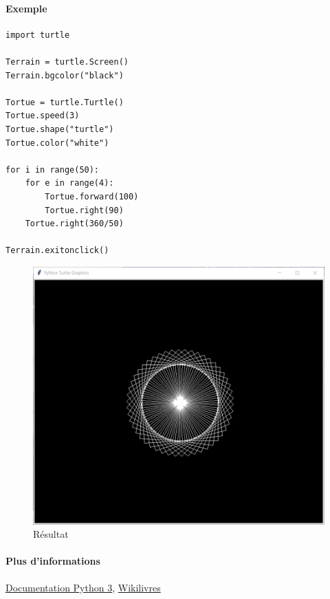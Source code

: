 \documentclass[a4paper, 10pt]{article}
\begin{document}
\paragraph{Exemple}
\begin{verbatim}
import turtle

Terrain = turtle.Screen()
Terrain.bgcolor("black")

Tortue = turtle.Turtle()
Tortue.speed(3)
Tortue.shape("turtle")
Tortue.color("white")

for i in range(50):
    for e in range(4):
        Tortue.forward(100)
        Tortue.right(90)
    Tortue.right(360/50)

Terrain.exitonclick()
\end{verbatim}

\begin{figure}[h]
    \begin{center}
        \includegraphics[scale=0.5]{turtle.PNG}
        \caption*{Résultat}
    \end{center}
\end{figure}

\paragraph{Plus d'informations} \href{https://docs.python.org/fr/3.6/library/turtle.html#methods-specific-to-screen-not-inherited-from-turtlescreen}{Documentation Python 3}, \href{https://fr.wikibooks.org/wiki/Programmation_Python/Turtle}{Wikilivres}
\end{document}
